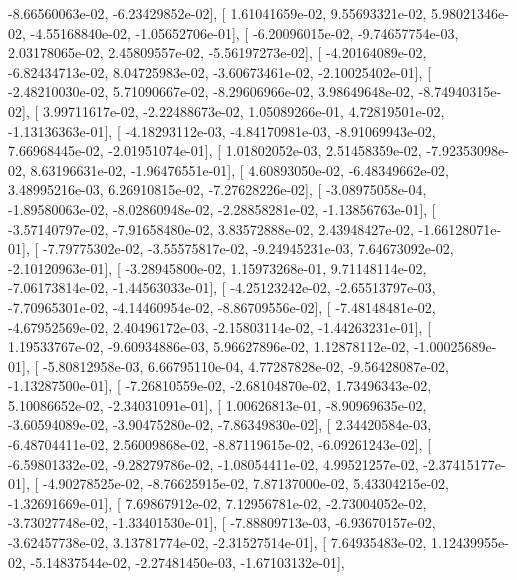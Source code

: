\documentclass{article}
\begin{document}
         -8.66560063e-02,  -6.23429852e-02],
       [  1.61041659e-02,   9.55693321e-02,   5.98021346e-02,
         -4.55168840e-02,  -1.05652706e-01],
       [ -6.20096015e-02,  -9.74657754e-03,   2.03178065e-02,
          2.45809557e-02,  -5.56197273e-02],
       [ -4.20164089e-02,  -6.82434713e-02,   8.04725983e-02,
         -3.60673461e-02,  -2.10025402e-01],
       [ -2.48210030e-02,   5.71090667e-02,  -8.29606966e-02,
          3.98649648e-02,  -8.74940315e-02],
       [  3.99711617e-02,  -2.22488673e-02,   1.05089266e-01,
          4.72819501e-02,  -1.13136363e-01],
       [ -4.18293112e-03,  -4.84170981e-03,  -8.91069943e-02,
          7.66968445e-02,  -2.01951074e-01],
       [  1.01802052e-03,   2.51458359e-02,  -7.92353098e-02,
          8.63196631e-02,  -1.96476551e-01],
       [  4.60893050e-02,  -6.48349662e-02,   3.48995216e-03,
          6.26910815e-02,  -7.27628226e-02],
       [ -3.08975058e-04,  -1.89580063e-02,  -8.02860948e-02,
         -2.28858281e-02,  -1.13856763e-01],
       [ -3.57140797e-02,  -7.91658480e-02,   3.83572888e-02,
          2.43948427e-02,  -1.66128071e-01],
       [ -7.79775302e-02,  -3.55575817e-02,  -9.24945231e-03,
          7.64673092e-02,  -2.10120963e-01],
       [ -3.28945800e-02,   1.15973268e-01,   9.71148114e-02,
         -7.06173814e-02,  -1.44563033e-01],
       [ -4.25123242e-02,  -2.65513797e-03,  -7.70965301e-02,
         -4.14460954e-02,  -8.86709556e-02],
       [ -7.48148481e-02,  -4.67952569e-02,   2.40496172e-03,
         -2.15803114e-02,  -1.44263231e-01],
       [  1.19533767e-02,  -9.60934886e-03,   5.96627896e-02,
          1.12878112e-02,  -1.00025689e-01],
       [ -5.80812958e-03,   6.66795110e-04,   4.77287828e-02,
         -9.56428087e-02,  -1.13287500e-01],
       [ -7.26810559e-02,  -2.68104870e-02,   1.73496343e-02,
          5.10086652e-02,  -2.34031091e-01],
       [  1.00626813e-01,  -8.90969635e-02,  -3.60594089e-02,
         -3.90475280e-02,  -7.86349830e-02],
       [  2.34420584e-03,  -6.48704411e-02,   2.56009868e-02,
         -8.87119615e-02,  -6.09261243e-02],
       [ -6.59801332e-02,  -9.28279786e-02,  -1.08054411e-02,
          4.99521257e-02,  -2.37415177e-01],
       [ -4.90278525e-02,  -8.76625915e-02,   7.87137000e-02,
          5.43304215e-02,  -1.32691669e-01],
       [  7.69867912e-02,   7.12956781e-02,  -2.73004052e-02,
         -3.73027748e-02,  -1.33401530e-01],
       [ -7.88809713e-03,  -6.93670157e-02,  -3.62457738e-02,
          3.13781774e-02,  -2.31527514e-01],
       [  7.64935483e-02,   1.12439955e-02,  -5.14837544e-02,
         -2.27481450e-03,  -1.67103132e-01],
\end{document}
